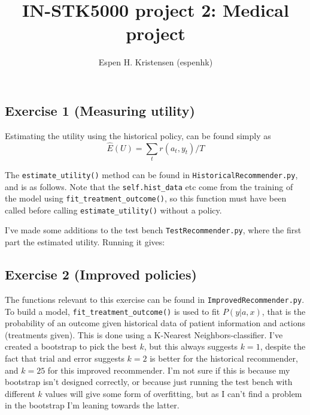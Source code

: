 \documentclass[a4paper]{article}
\begin{document}
\title{IN-STK5000 project 2: Medical project}
\author{Espen H. Kristensen (espenhk)}
\maketitle

\listoftodos


\subsection*{Exercise 1 (Measuring utility)}

Estimating the utility using the historical policy, can be found simply as
\begin{equation*}
  \hat{E}(U) = \sum_t r(a_t, y_t) / T
\end{equation*}

The \texttt{estimate\_utility()} method can be found in \texttt{HistoricalRecommender.py}, and is as
follows. Note that the \texttt{self.hist\_data} etc come from the training of the model using
\texttt{fit\_treatment\_outcome()}, so this function must have been called before calling
\texttt{estimate\_utility()} without a policy.



I've made some additions to the test bench \texttt{TestRecommender.py}, where the first part
the estimated utility. Running it gives:


\subsection*{Exercise 2 (Improved policies)}

The functions relevant to this exercise can be found in \texttt{ImprovedRecommender.py}. To build a
model, \texttt{fit\_treatment\_outcome()} is used to fit $P(y|a,x)$, that is the probability of an
outcome given historical data of patient information and actions (treatments given). This is done using
a K-Nearest Neighbors-classifier. I've created a bootstrap to pick the best $k$, but this always
suggests $k=1$, despite the fact that trial and error suggests $k = 2$ is better for the historical
recommender, and $k = 25$ for this improved recommender.  I'm not sure if this is because my bootstrap
isn't designed correctly, or because just running the test bench with different $k$ values will give
some form of overfitting, but as I can't find a problem in the bootstrap I'm leaning towards the latter.
\end{document}
